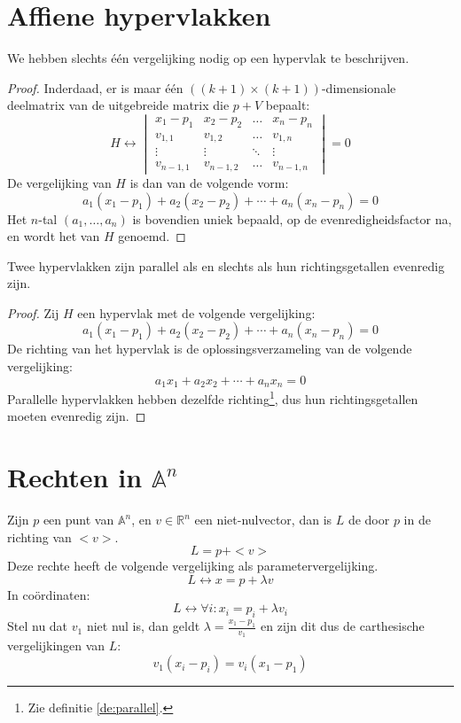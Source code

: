 \documentclass[main.tex]{subfiles}
\begin{document}
\section{Affiene hypervlakken}
\label{sec:affiene-hypervlakken}
\begin{st}
  \label{st:vergelijking-affien-hypervlak}
  We hebben slechts \'e\'en vergelijking nodig op een hypervlak te beschrijven.
  
  \begin{proof}
    Inderdaad, er is maar \'e\'en $((k+1)\times(k+1))$-dimensionale deelmatrix van de uitgebreide matrix die $p+V$ bepaalt:
    \[
    H \leftrightarrow
    \begin{vmatrix}
    x_{1}-p_{1}   & x_{2}-p_{2}  & \hdots & x_{n}-p_{n}\\
    v_{1,1}       & v_{1,2}      & \hdots & v_{1,n}\\
    \vdots        & \vdots       & \ddots & \vdots\\
    v_{n-1,1}     & v_{n-1,2}    & \hdots & v_{n-1,n} 
    \end{vmatrix}
    = 0
    \]
    De vergelijking van $H$ is dan van de volgende vorm:
    \[
    a_{1}(x_{1}-p_{1}) + a_{2}(x_{2}-p_{2}) + \dotsb + a_{n}(x_{n}-p_{n}) = 0
    \]
    Het $n$-tal $(a_{1},\dotsc,a_{n})$ is bovendien uniek bepaald, op de evenredigheidsfactor na, en wordt het  van $H$ genoemd.
  \end{proof}
\end{st}

\begin{st}
  \label{st:parallelle-hypervlakken-gelijke-richtingsgetallen}
  Twee hypervlakken zijn parallel als en slechts als hun richtingsgetallen evenredig zijn.
  \begin{proof}
  Zij $H$ een hypervlak met de volgende vergelijking:
  \[
    a_{1}(x_{1}-p_{1}) + a_{2}(x_{2}-p_{2}) + \dotsb + a_{n}(x_{n}-p_{n}) = 0
  \]
  De richting van het hypervlak is de oplossingsverzameling van de volgende vergelijking:
  \[
    a_{1}x_{1} + a_{2}x_{2} + \dotsb + a_{n}x_{n} = 0
  \]
  Parallelle hypervlakken hebben dezelfde richting\footnote{Zie definitie \ref{de:parallel}.}, dus hun richtingsgetallen moeten evenredig zijn.
  \end{proof}
\end{st}


\section{Rechten in $\mathbb{A}^{n}$}
\begin{de}
  \label{de:rechte}
  Zijn $p$ een punt van $\mathbb{A}^{n}$, en $v\in \mathbb{R}^{n}$ een niet-nulvector, dan is $L$ de  door $p$ in de richting van $<v>$.
  \[
  L = p + <v>
  \]
  Deze rechte heeft de volgende vergelijking als parametervergelijking.
  \[
  L \leftrightarrow x = p + \lambda v
  \]
  In co\"ordinaten:
  \[
  L \leftrightarrow \forall i: x_{i} = p_{i} + \lambda v_{i}
  \]
  Stel nu dat $v_{1}$ niet nul is, dan geldt $\lambda = \frac{x_{1}-p_{1}}{v_{1}}$ en zijn dit dus de carthesische vergelijkingen van $L$:
  \[
  v_{1}(x_{i}-p_{i}) = v_{i}(x_{1}-p_{1})
  \]
\end{de}
\end{document}
